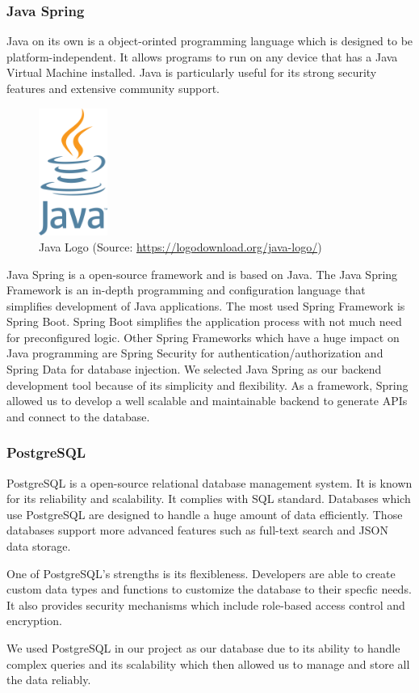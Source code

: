 \Author{\daAuthorThree} %

\subsubsection{Java Spring}
Java on its own is a object-orinted programming language which is designed to be platform-independent. It allows programs to run on any device that has a Java Virtual Machine installed. Java is particularly useful for its strong security features and extensive community support.

\begin{figure} [H]
    \center
    \includegraphics [width=0.2\textwidth] {images/Technologies/javaLogo.png}
    \caption{Java Logo (Source: \url{https://logodownload.org/java-logo/})}
\end{figure}

Java Spring is a open-source framework and is based on Java. The Java Spring Framework is an in-depth programming and configuration language that simplifies development of Java applications. The most used Spring Framework is Spring Boot. Spring Boot simplifies the application process with not much need for preconfigured logic. Other Spring Frameworks which have a huge impact on Java programming are Spring Security for authentication/authorization and Spring Data for database injection. 
We selected Java Spring as our backend development tool because of its simplicity and flexibility. As a framework, Spring allowed us to develop a well scalable and maintainable backend to generate APIs and connect to the database.       

\subsubsection{PostgreSQL}
PostgreSQL is a open-source relational database management system. It is known for its reliability and scalability. It complies with SQL standard. Databases which use PostgreSQL are designed to handle a huge amount of data efficiently. Those databases support more advanced features such as full-text search and JSON data storage.

One of PostgreSQL's strengths is its flexibleness. Developers are able to create custom data types and functions to customize the database to their specfic needs. It also provides security mechanisms which include role-based access control and encryption.

We used PostgreSQL in our project as our database due to its ability to handle complex queries and its scalability which then allowed us to manage and store all the data reliably.

\newpage